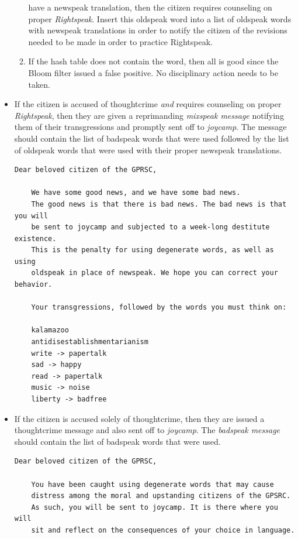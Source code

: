 \documentclass{article}
\begin{document}
\begin{itemize}
\begin{enumerate}
        have a newspeak translation, then the citizen requires
        counseling on proper \emph{Rightspeak}. Insert this oldspeak
        word into a list of oldspeak words with newspeak translations in
        order to notify the citizen of the revisions needed to be made
        in order to practice Rightspeak.
      \item If the hash table does not contain the word, then all is
        good since the Bloom filter issued a false positive. No
        disciplinary action needs to be taken.
    \end{enumerate}
  \item If the citizen is accused of thoughtcrime \emph{and} requires
    counseling on proper \emph{Rightspeak}, then they are given a
    reprimanding \emph{mixspeak message} notifying them of their
    transgressions and promptly sent off to \emph{joycamp}. The message
    should contain the list of badspeak words that were used followed by
    the list of oldspeak words that were used with their proper newspeak
    translations.

    \begin{lstlisting}[style=plainstyle]
    Dear beloved citizen of the GPRSC,

    We have some good news, and we have some bad news.
    The good news is that there is bad news. The bad news is that you will
    be sent to joycamp and subjected to a week-long destitute existence.
    This is the penalty for using degenerate words, as well as using
    oldspeak in place of newspeak. We hope you can correct your behavior.

    Your transgressions, followed by the words you must think on:

    kalamazoo
    antidisestablishmentarianism
    write -> papertalk
    sad -> happy
    read -> papertalk
    music -> noise
    liberty -> badfree\end{lstlisting}

  \item If the citizen is accused solely of thoughtcrime, then they are
    issued a thoughtcrime message and also sent off to \emph{joycamp}.
    The \emph{badspeak message} should contain the list of badspeak
    words that were used.

  \begin{lstlisting}[style=plainstyle]
    Dear beloved citizen of the GPRSC,

    You have been caught using degenerate words that may cause
    distress among the moral and upstanding citizens of the GPSRC.
    As such, you will be sent to joycamp. It is there where you will
    sit and reflect on the consequences of your choice in language.


\end{lstlisting}
\end{itemize}
\end{document}
